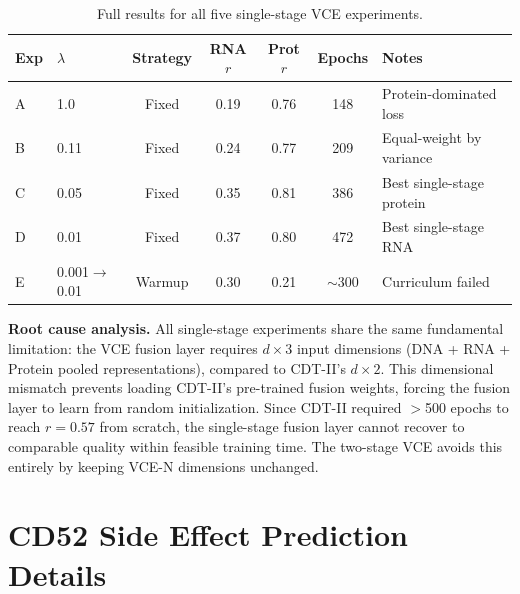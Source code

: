 \documentclass{article}
\begin{document}
\begin{table}[H]
\centering
\caption{Full results for all five single-stage VCE experiments.}
\begin{tabular}{llccccl}
\toprule
Exp & $\lambda$ & Strategy & RNA $r$ & Prot $r$ & Epochs & Notes \\
\midrule
A & 1.0 & Fixed & 0.19 & 0.76 & 148 & Protein-dominated loss \\
B & 0.11 & Fixed & 0.24 & 0.77 & 209 & Equal-weight by variance \\
C & 0.05 & Fixed & 0.35 & 0.81 & 386 & Best single-stage protein \\
D & 0.01 & Fixed & 0.37 & 0.80 & 472 & Best single-stage RNA \\
E & 0.001$\to$0.01 & Warmup & 0.30 & 0.21 & $\sim$300 & Curriculum failed \\
\bottomrule
\end{tabular}
\label{tab:ablation_full}
\end{table}

\textbf{Root cause analysis.} All single-stage experiments share the same fundamental limitation: the VCE fusion layer requires $d \times 3$ input dimensions (DNA + RNA + Protein pooled representations), compared to CDT-II's $d \times 2$. This dimensional mismatch prevents loading CDT-II's pre-trained fusion weights, forcing the fusion layer to learn from random initialization. Since CDT-II required $>$500 epochs to reach $r = 0.57$ from scratch, the single-stage fusion layer cannot recover to comparable quality within feasible training time. The two-stage VCE avoids this entirely by keeping VCE-N dimensions unchanged.

\section{CD52 Side Effect Prediction Details}
\label{app:cd52}
\end{document}
